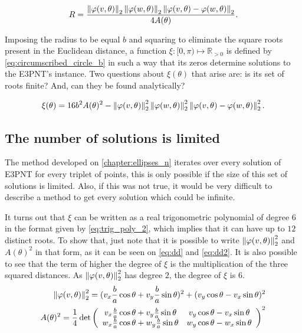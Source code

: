 \begin{equation}\label{eq:circumscribed_circle}
R = \dfrac{\left\lVert\varphi(v, \theta)\right\rVert_{2}\left\lVert\varphi(w, \theta)\right\rVert_{2}\left\lVert\varphi(v, \theta)-\varphi(w, \theta)\right\rVert_{2}   }{4A(\theta)}.
\end{equation}

Imposing the radius to be equal $b$ and squaring to eliminate the square roots present in the Euclidean distance, a function $\xi : [0, \pi) \mapsto \mathbb{R}_{>0}$ is defined by \autoref{eq:circumscribed_circle_b} in such a way that its zeros determine solutions to the E3PNT's instance. Two questions about $\xi(\theta)$ that arise are: is its set of roots finite? And, can they be found analytically?

\begin{equation}\label{eq:circumscribed_circle_b}
\xi(\theta) = 16b^2A(\theta)^2 - \left\lVert\varphi(v, \theta)\right\rVert_{2}^2\left\lVert\varphi(w, \theta)\right\rVert_{2}^2\left\lVert\varphi(v, \theta)-\varphi(w, \theta)\right\rVert_{2}^2.
\end{equation}

\subsection{The number of solutions is limited}

The method developed on \autoref{chapter:ellipses_n} iterates over every solution of E3PNT for every triplet of points, this is only possible if the size of this set of solutions is limited. Also, if this was not true, it would be very difficult to describe a method to get every solution which could be infinite.

It turns out that $\xi$ can be written as a real trigonometric polynomial of degree $6$ in the format given by \autoref{eq:trig_poly_2}, which implies that it can have up to $12$ distinct roots.
 To show that, just note that it is possible to write $\left\lVert\varphi(v, \theta)\right\rVert_{2}^2$ and $A(\theta)^2$ in that form, as it can be seen on \autoref{eq:dd} and \autoref{eq:dd2}. It is also possible to see that the term of higher the degree of $\xi$ is the multiplication of the three squared distances. As $\left\lVert\varphi(v, \theta)\right\rVert_{2}^2$ has degree $2$, the degree of $\xi$ is $6$.
\begin{align}\label{eq:dd}
	\left\lVert\varphi(v, \theta)\right\rVert_{2}^2 = (v_x\frac{b}{a}\cos\theta + v_y\frac{b}{a}\sin\theta)^2 + (v_y\cos\theta - v_x\sin\theta)^2\\
	\label{eq:dd2} A(\theta)^2=\dfrac{1}{4}\det\left(
	\begin{array}{cc}
		v_x\frac{b}{a}\cos\theta + v_y\frac{b}{a}\sin\theta&v_y\cos\theta - v_x\sin\theta\\
		w_x\frac{b}{a}\cos\theta + w_y\frac{b}{a}\sin\theta&w_y\cos\theta - w_x\sin\theta
	\end{array}\right)^2
\end{align}

